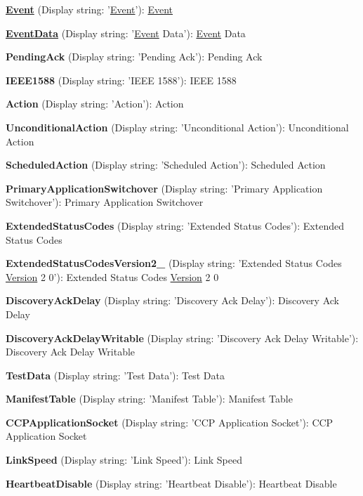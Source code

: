 \begin{DoxyItemize}
\item {\bfseries \hyperlink{classmv_i_m_p_a_c_t_1_1acquire_1_1_event}{Event}} (Display string\+: '\hyperlink{classmv_i_m_p_a_c_t_1_1acquire_1_1_event}{Event}')\+: \hyperlink{classmv_i_m_p_a_c_t_1_1acquire_1_1_event}{Event}
\item {\bfseries \hyperlink{struct_event_data}{Event\+Data}} (Display string\+: '\hyperlink{classmv_i_m_p_a_c_t_1_1acquire_1_1_event}{Event} Data')\+: \hyperlink{classmv_i_m_p_a_c_t_1_1acquire_1_1_event}{Event} Data
\item {\bfseries Pending\+Ack} (Display string\+: 'Pending Ack')\+: Pending Ack
\item {\bfseries I\+E\+E\+E1588} (Display string\+: 'I\+E\+E\+E 1588')\+: I\+E\+E\+E 1588
\item {\bfseries Action} (Display string\+: 'Action')\+: Action
\item {\bfseries Unconditional\+Action} (Display string\+: 'Unconditional Action')\+: Unconditional Action
\item {\bfseries Scheduled\+Action} (Display string\+: 'Scheduled Action')\+: Scheduled Action
\item {\bfseries Primary\+Application\+Switchover} (Display string\+: 'Primary Application Switchover')\+: Primary Application Switchover
\item {\bfseries Extended\+Status\+Codes} (Display string\+: 'Extended Status Codes')\+: Extended Status Codes
\item {\bfseries Extended\+Status\+Codes\+Version2\+\_} (Display string\+: 'Extended Status Codes \hyperlink{struct_version}{Version} 2 0')\+: Extended Status Codes \hyperlink{struct_version}{Version} 2 0
\item {\bfseries Discovery\+Ack\+Delay} (Display string\+: 'Discovery Ack Delay')\+: Discovery Ack Delay
\item {\bfseries Discovery\+Ack\+Delay\+Writable} (Display string\+: 'Discovery Ack Delay Writable')\+: Discovery Ack Delay Writable
\item {\bfseries Test\+Data} (Display string\+: 'Test Data')\+: Test Data
\item {\bfseries Manifest\+Table} (Display string\+: 'Manifest Table')\+: Manifest Table
\item {\bfseries C\+C\+P\+Application\+Socket} (Display string\+: 'C\+C\+P Application Socket')\+: C\+C\+P Application Socket
\item {\bfseries Link\+Speed} (Display string\+: 'Link Speed')\+: Link Speed
\item {\bfseries Heartbeat\+Disable} (Display string\+: 'Heartbeat Disable')\+: Heartbeat Disable

\end{DoxyItemize}
